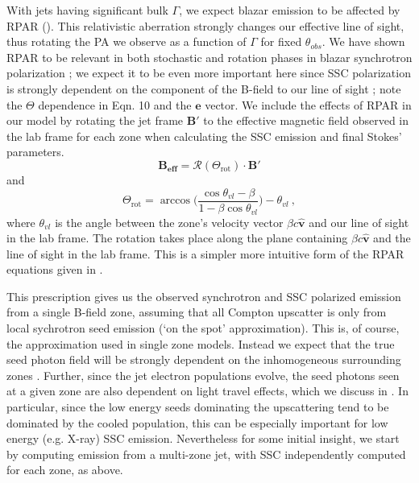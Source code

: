 With jets having significant bulk $\Gamma$, we expect blazar emission to be affected by RPAR (\citealp{peirson_polarization_2018, lyutikov_polarization_2003}). This relativistic aberration strongly changes our effective line of sight, thus rotating the PA we observe as a function of $\Gamma$ for fixed $\theta_{obs}$. We have shown RPAR to be relevant in both stochastic and rotation phases in blazar synchrotron polarization \citep{peirson_polarization_2018}; we expect it to be even more important here since SSC polarization is strongly dependent on the component of the B-field to our line of sight \citep{bonometto_polarization_1973}; note the $\Theta$ dependence in Eqn. 10 and the $\mathbf{e}$ vector.
We include the effects of RPAR in our model by rotating the jet frame $\mathbf{B'}$ to the effective magnetic field observed in the lab frame for each zone %
when calculating the SSC emission and final Stokes' parameters.
\begin{equation}
    \mathbf{B_{eff}} = \mathcal{R}(\Theta_\mathrm{rot}) \cdot \mathbf{B'}
\end{equation}
and
\begin{equation}
    \Theta_\mathrm{rot} = \arccos\bigg(\frac{\cos\theta_{vl}-\beta}{1-\beta \cos\theta_{vl}}\bigg) - \theta_{vl}~,
\end{equation}
where $\theta_{vl}$ is the angle between the zone's velocity vector $\beta c \hat{\mathbf{v}}$ and our line of sight in the lab frame. The rotation takes place along the plane containing $\beta c \hat{\mathbf{v}}$ and the line of sight in the lab frame. This is a simpler more intuitive form of the RPAR equations given in  \citealp{peirson_polarization_2018, lyutikov_polarization_2003}.

This prescription gives us the observed synchrotron and SSC polarized emission from a single B-field zone, assuming that all Compton upscatter is only from local sychrotron seed emission (`on the spot' approximation). This is, of course, the approximation used in single zone models. Instead we expect that the true seed photon field will be strongly dependent on the inhomogeneous surrounding zones . Further, since the jet electron populations evolve, the seed photons seen at a given zone are also dependent on light travel effects, which we discuss in . In particular, since the low energy seeds dominating the upscattering tend to be dominated by the cooled population, this can be especially important for low energy (e.g. X-ray) SSC emission. Nevertheless for some initial insight, we start by computing emission from a multi-zone jet, with SSC independently computed for each zone, as above.

